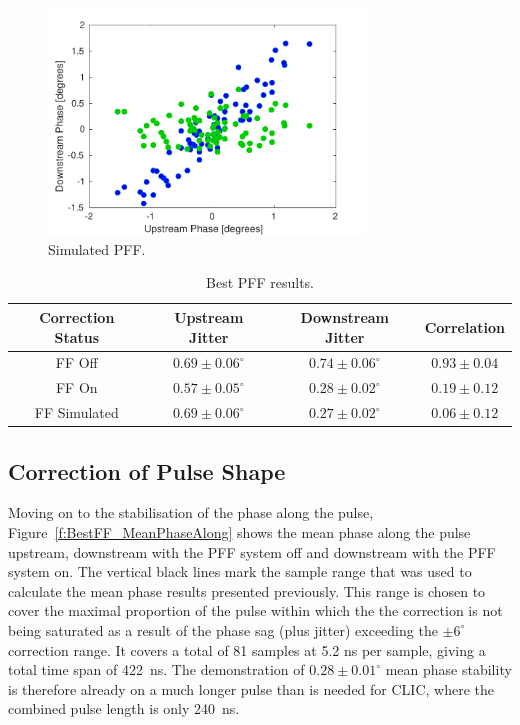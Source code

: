 \begin{figure}
  \centering
  \includegraphics[width=0.75\textwidth]{Figures/feedforward/BestFF_Simulated}
  \caption{Simulated PFF.}
  \label{f:BestFF_Simulated}
\end{figure}


\begin{table}
  \begin{center}
    \begin{tabular}{| c | c | c | c |}
	   \hline
       Correction Status & Upstream Jitter & Downstream Jitter & Correlation \\ \hline
       FF Off & \(0.69\pm0.06^\circ\) & \(0.74\pm0.06^\circ\) & \(0.93\pm0.04\) \\
	   FF On & \(0.57\pm0.05^\circ\) & \(0.28\pm0.02^\circ\) & \(0.19\pm0.12\) \\
	   FF Simulated & \(0.69\pm0.06^\circ\) & \(0.27\pm0.02^\circ\) & \(0.06\pm0.12\) \\ \hline
    \end{tabular}
    \caption{Best PFF results.}
  	\label{t:BestFF}
  \end{center}
\end{table}

\subsection{Correction of Pulse Shape}
\label{ss:bestPulseShape}

Moving on to the stabilisation of the phase along the pulse, 
Figure~\ref{f:BestFF_MeanPhaseAlong} shows the mean phase along the pulse upstream, 
downstream with the PFF system off and downstream with the PFF system on. The vertical 
black lines mark the sample range that was used to calculate the mean phase results 
presented previously. This range is chosen to cover the maximal proportion of the pulse 
within which the the correction is not being saturated as a result of the phase sag 
(plus jitter) exceeding the \(\pm6^\circ\) correction range. It covers a total of 81 
samples at 5.2 ns per sample, giving a total time span of 422~ns. The demonstration of 
\(0.28\pm0.01^\circ\) mean phase stability is therefore already on a much longer pulse 
than is needed for CLIC, where the combined pulse length is only 240~ns. 




